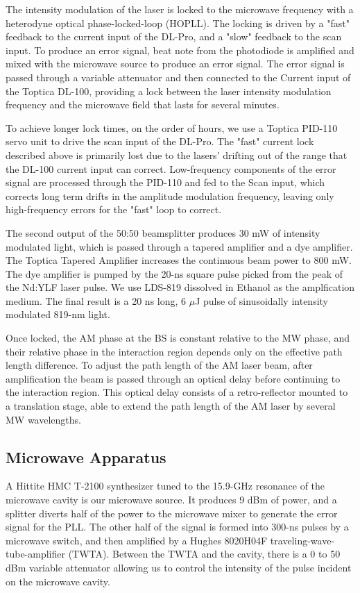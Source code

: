 \documentclass[aps,pra,preprint,groupedaddress]{revtex4-1}
\begin{document}
The intensity modulation of the laser is locked to the microwave frequency with a heterodyne optical phase-locked-loop (HOPLL). The locking is driven by a "fast" feedback to the current input of the DL-Pro, and a "slow" feedback to the scan input. To produce an error signal, beat note from the photodiode is amplified and mixed with the microwave source to produce an error signal. The error signal is passed through a variable attenuator and then connected to the Current input of the Toptica DL-100, providing a lock between the laser intensity modulation frequency and the microwave field that lasts for several minutes.

To achieve longer lock times, on the order of hours, we use a Toptica PID-110 servo unit to drive the scan input of the DL-Pro. The "fast" current lock described above is primarily lost due to the lasers' drifting out of the range that the DL-100 current input can correct. Low-frequency components of the error signal are processed through the PID-110 and fed to the Scan input, which corrects long term drifts in the amplitude modulation frequency, leaving only high-frequency errors for the "fast" loop to correct.

The second output of the 50:50 beamsplitter produces 30 mW of intensity modulated light, which is passed through a tapered amplifier and a dye amplifier. The Toptica Tapered Amplifier increases the continuous beam power to 800 mW. The dye amplifier is pumped by the 20-ns square pulse picked from the peak of the Nd:YLF laser pulse. We use LDS-819 dissolved in Ethanol as the amplfication medium. The final result is a 20 ns long, 6 $\mu$J pulse of sinusoidally intensity modulated 819-nm light.

Once locked, the AM phase at the BS is constant relative to the MW phase, and their relative phase in the interaction region depends only on the effective path length difference. To adjust the path length of the AM laser beam, after amplification the beam is passed through an optical delay before continuing to the interaction region. This optical delay consists of a retro-reflector mounted to a translation stage, able to extend the path length of the AM laser by several MW wavelengths.

\subsection{\label{cavity} Microwave Apparatus}

A Hittite HMC T-2100 synthesizer tuned to the 15.9-GHz resonance of the microwave cavity is our microwave source. It produces 9 dBm of power, and a splitter diverts half of the power to the microwave mixer to generate the error signal for the PLL. The other half of the signal is formed into 300-ns pulses by a microwave switch, and then amplified by a Hughes 8020H04F traveling-wave-tube-amplifier (TWTA). Between the TWTA and the cavity, there is a 0 to 50 dBm variable attenuator allowing us to control the intensity of the pulse incident on the microwave cavity.
\end{document}
